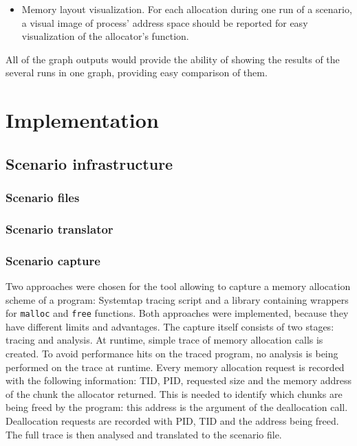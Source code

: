 \begin{itemize}
\item Memory layout visualization. For each allocation during one run of a scenario, a visual image of process' address space should be reported for easy visualization of the allocator's function.
\end{itemize}

All of the graph outputs would provide the ability of showing the results of the several runs in one graph, providing easy comparison of them.

\section{Implementation}
\subsection{Scenario infrastructure}
\subsubsection{Scenario files}
\subsubsection{Scenario translator}
\subsubsection{Scenario capture}
Two approaches were chosen for the tool allowing to capture a memory allocation scheme of a program: Systemtap tracing script\cite{systemtap} and a library containing wrappers for {\tt malloc} and {\tt free} functions. Both approaches were implemented, because they have different limits and advantages. The capture itself consists of two stages: tracing and analysis. At runtime, simple trace of memory allocation calls is created. To avoid performance hits on the traced program, no analysis is being performed on the trace at runtime. Every memory allocation request is recorded with the following information: TID, PID, requested size and the memory address of the chunk the allocator returned. This is needed to identify which chunks are being freed by the program: this address is the argument of the deallocation call. Deallocation requests are recorded with PID, TID and the address being freed. The full trace is then analysed and translated to the scenario file.

